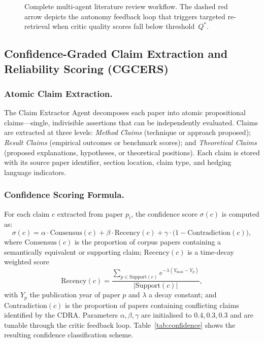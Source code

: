 \documentclass{llncs}
\begin{document}
\begin{figure}[htbp]
\caption{Complete multi-agent literature review workflow. The dashed red arrow
  depicts the autonomy feedback loop that triggers targeted re-retrieval when
  critic quality scores fall below threshold~$Q^*$.}
\label{fig:workflow}
\end{figure}

\subsection{Confidence-Graded Claim Extraction and Reliability Scoring (CGCERS)}

\subsubsection{Atomic Claim Extraction.}

The Claim Extractor Agent decomposes each paper into atomic propositional
claims—single, indivisible assertions that can be independently evaluated.
Claims are extracted at three levels:
\textit{Method Claims} (technique or approach proposed);
\textit{Result Claims} (empirical outcomes or benchmark scores); and
\textit{Theoretical Claims} (proposed explanations, hypotheses, or theoretical
positions). Each claim is stored with its source paper identifier, section
location, claim type, and hedging language indicators.

\subsubsection{Confidence Scoring Formula.}

For each claim $c$ extracted from paper $p_i$, the confidence score
$\sigma(c)$ is computed as:
\begin{equation}
  \sigma(c) = \alpha \cdot \text{Consensus}(c)
            + \beta  \cdot \text{Recency}(c)
            + \gamma \cdot \bigl(1 - \text{Contradiction}(c)\bigr),
  \label{eq:confidence}
\end{equation}
where $\text{Consensus}(c)$ is the proportion of corpus papers containing a
semantically equivalent or supporting claim; $\text{Recency}(c)$ is a
time-decay weighted score
\begin{equation}
  \text{Recency}(c) = \frac{\sum_{p \in \text{Support}(c)} e^{-\lambda(Y_{\max}-Y_p)}}
                          {|\text{Support}(c)|},
\end{equation}
with $Y_p$ the publication year of paper $p$ and $\lambda$ a decay constant;
and $\text{Contradiction}(c)$ is the proportion of papers containing
conflicting claims identified by the CDRA. Parameters $\alpha, \beta, \gamma$
are initialised to $0.4, 0.3, 0.3$ and are tunable through the critic
feedback loop. Table~\ref{tab:confidence} shows the resulting confidence
classification scheme.
\end{document}
